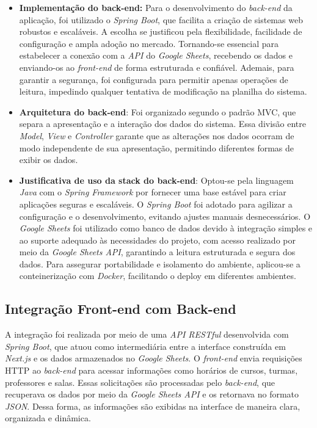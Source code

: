 \begin{itemize}
    \item \textbf{Implementação do back-end:} Para o desenvolvimento do \textit{back-end} da aplicação, foi utilizado o \textit{Spring Boot}, que facilita a criação de sistemas web robustos e escaláveis. A escolha se justificou pela flexibilidade, facilidade de configuração e ampla adoção no mercado. Tornando-se essencial para estabelecer a conexão com a \textit{API} do \textit{Google Sheets}, recebendo os dados e enviando-os ao \textit{front-end} de forma estruturada e confiável. Ademais, para garantir a segurança, foi configurada para permitir apenas operações de leitura, impedindo qualquer tentativa de modificação na planilha do sistema.
    \item \textbf{Arquitetura do back-end}: Foi organizado segundo o padrão MVC, que separa a apresentação e a interação dos dados do sistema. Essa divisão entre \textit{Model}, \textit{View} e \textit{Controller} garante que as alterações nos dados ocorram de modo independente de sua apresentação, permitindo diferentes formas de exibir os dados.
    \item \textbf{Justificativa de uso da stack do back-end}: Optou-se pela linguagem \textit{Java} com o \textit{Spring Framework} por fornecer uma base estável para criar aplicações seguras e escaláveis. O \textit{Spring Boot} foi adotado para agilizar a configuração e o desenvolvimento, evitando ajustes manuais desnecessários. O \textit{Google Sheets} foi utilizado como banco de dados devido à integração simples e ao suporte adequado às necessidades do projeto, com acesso realizado por meio da \textit{Google Sheets API}, garantindo a leitura estruturada e segura dos dados. Para assegurar portabilidade e isolamento do ambiente, aplicou-se a conteinerização com \textit{Docker}, facilitando o deploy em diferentes ambientes.
\end{itemize}

\subsection{Integração Front-end com Back-end}

A integração foi realizada por meio de uma \textit{API RESTful} desenvolvida com \textit{Spring Boot}, que atuou como intermediária entre a interface construída em \textit{Next.js} e os dados armazenados no \textit{Google Sheets}. O \textit{front-end} envia requisições HTTP ao \textit{back-end} para acessar informações como horários de cursos, turmas, professores e salas. Essas solicitações são processadas pelo \textit{back-end}, que recuperava os dados por meio da \textit{Google Sheets API} e os retornava no formato \textit{JSON}. Dessa forma, as informações são exibidas na interface de maneira clara, organizada e dinâmica.

